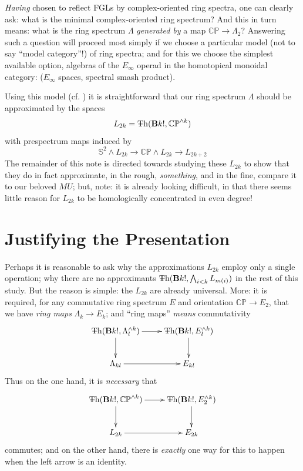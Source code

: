 \documentclass{article}
\newcommand{\CP}{\mathbb{CP}}
\newcommand{\sph}{\mathbb{S}}
\newcommand{\6}{\partial}
\newcommand{\8}{\infty}
\newcommand{\smsh}{\wedge}
\begin{document}
{\em Having} chosen to reflect FGLs by complex-oriented ring spectra, one can clearly ask:
 what is the minimal complex-oriented ring spectrum?  
And this in turn means: what is the ring spectrum $\Lambda$ {\em generated by} a map $\CP \to \Lambda_2$?  
Answering such a question will proceed most simply if we choose a particular model (not to say ``model category''!) of ring spectra;
 and for this we choose the simplest available option, algebras of the $E_\infty$ operad in the homotopical monoidal category:
 ($E_\infty$ spaces, spectral smash product).

Using this model (cf. \cite{mayRings}) it is straightforward that our ring spectrum $\Lambda$ should be approximated by the spaces
$$ L_{2k} = \Th(\deloop k!,\CP^{\smsh k}) $$
with prespectrum maps induced by
$$ \sph^2 \smsh L_{2k} \to \CP \smsh L_{2k} \to L_{2k+2} $$
The remainder of this note is directed towards studying these $L_{2k}$ to show that they do in fact approximate, in the rough, {\em something}, and in the fine, compare it to our beloved $MU$; but, note: it is already looking difficult, in that there seems little reason for $L_{2k}$ to be homologically concentrated in even degree!

\section{Justifying the Presentation}

Perhaps it is reasonable to ask why the approximations $L_{2k}$ employ only a single operation; why there are no approximants $\Th(\deloop k!,\bigwedge_{i < k} L_{m(i)})$ in the rest of this study.  But the reason is simple: the $L_{2k}$ are already universal.  More: it is required, for any commutative ring spectrum $E$ and orientation $\CP\to E_2$, that we have {\em ring maps} $\Lambda_k \to E_k$; and ``ring maps'' {\em means} commutativity
$$ \begin{xy}\xymatrix{
\Th(\deloop k!, \Lambda_l^{\smsh k}) \ar[r] \ar[d] & \Th(\deloop k!,E_l^{\smsh k}) \ar[d]\\
\Lambda_{kl} \ar[r] & E_{kl}
}\end{xy} $$
Thus on the one hand, it is {\em necessary} that
$$\begin{xy} \xymatrix{
\Th(\deloop k!,\CP^{\smsh k}) \ar[r] \ar[d] & \Th(\deloop k!, E_2^{\smsh k}) \ar[d] \\
L_{2k} \ar[r] & E_{2k} } \end{xy} $$ commutes; and on the other hand, there is {\em exactly} one way for this to happen when the left arrow is an identity.
\end{document}
